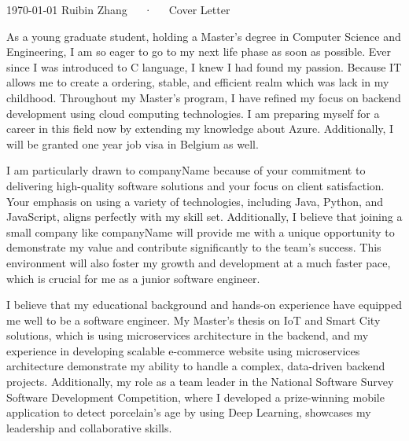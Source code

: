 \documentclass[11pt, a4paper]{awesome-cv}
\begin{document}
\makecvheader[C]

\makecvfooter
  {\today}
  {Ruibin Zhang~~~·~~~Cover Letter}
  {}

\makelettertitle

\begin{cvletter}

As a young graduate student, holding a Master's degree in Computer Science and Engineering, I am so eager to go to my next life phase as soon as possible. Ever since I was introduced to C language, I knew I had found my passion. Because IT allows me to create a ordering, stable, and efficient realm which was lack in my childhood. Throughout my Master's program, I have refined my focus on backend development using cloud computing technologies. I am preparing myself for a career in this field now by extending my knowledge about Azure. Additionally,  I will be granted one year job visa in Belgium as well.




I am particularly drawn to {companyName} because of your commitment to delivering high-quality software solutions and your focus on client satisfaction. Your emphasis on using a variety of technologies, including Java, Python, and JavaScript, aligns perfectly with my skill set. Additionally, I believe that joining a small company like {companyName} will provide me with a unique opportunity to demonstrate my value and contribute significantly to the team’s success. This environment will also foster my growth and development at a much faster pace, which is crucial for me as a junior software engineer.

I believe that my educational background and hands-on experience have equipped me well to be a software engineer. My Master's thesis on IoT and Smart City solutions, which is using microservices architecture in the backend,  and my experience in developing scalable e-commerce website using microservices architecture demonstrate my ability to handle a complex, data-driven backend projects. Additionally, my role as a team leader in the National Software Survey Software Development Competition, where I developed a prize-winning mobile application to detect porcelain's age by using Deep Learning, showcases my leadership and collaborative skills.


\end{cvletter}
\end{document}
